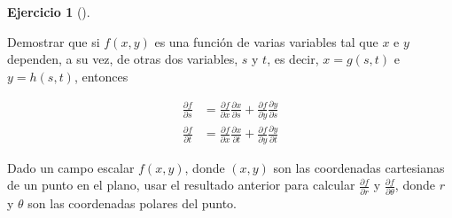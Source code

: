 \documentclass[
  a4paper,
]{scrreport}
\theoremstyle{definition}
\newtheorem{exercise}{Ejercicio}[chapter]
\theoremstyle{remark}
\begin{document}
\begin{exercise}[]\protect\hypertarget{exr-regla-cadena-coordenadas-polares}{}\label{exr-regla-cadena-coordenadas-polares}

Demostrar que si \(f(x,y)\) es una función de varias variables tal que
\(x\) e \(y\) dependen, a su vez, de otras dos variables, \(s\) y \(t\),
es decir, \(x=g(s,t)\) e \(y=h(s,t)\), entonces

\begin{align*}
\frac{\partial f}{\partial s} 
&= \frac{\partial f}{\partial x} \frac{\partial x}{\partial s} + \frac{\partial f}{\partial y} \frac{\partial y}{\partial s} \\
\frac{\partial f}{\partial t} 
&= \frac{\partial f}{\partial x} \frac{\partial x}{\partial t} + \frac{\partial f}{\partial y} \frac{\partial y}{\partial t} 
\end{align*}

Dado un campo escalar \(f(x,y)\), donde \((x,y)\) son las coordenadas
cartesianas de un punto en el plano, usar el resultado anterior para
calcular \(\frac{\partial f}{\partial r}\) y
\(\frac{\partial f}{\partial \theta}\), donde \(r\) y \(\theta\) son las
coordenadas polares del punto.

\end{exercise}
\end{document}

